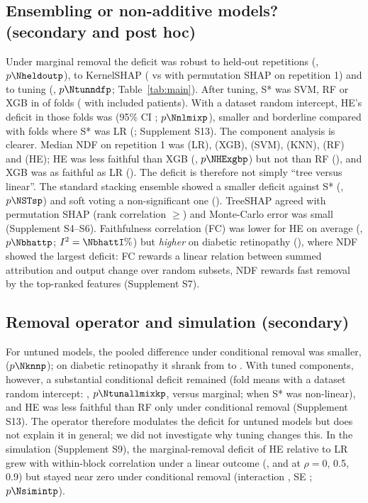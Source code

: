 \subsection{Ensembling or non-additive models? (secondary and post hoc)}
Under marginal removal the deficit was robust to held-out repetitions (\Nheldout, $p\Nheldoutp$), to KernelSHAP (\Nkernel{} vs \Nperm{} with permutation SHAP on repetition 1) and to tuning (\Ntunndf, $p\Ntunndfp$; Table~\ref{tab:main}). After tuning, S* was SVM, RF or XGB in \Nnlfoldsall{} of \Ntunfolds{} folds (\Nnlfoldsused{} with included patients). With a dataset random intercept, HE's deficit in those folds was \Nnlmix{} (95\% CI \Nnlmixci; $p\Nnlmixp$), smaller and borderline compared with folds where S* was LR (\Nlmix; Supplement S13). The component analysis is clearer. Median NDF on repetition 1 was \NmedLR{} (LR), \NmedXGB{} (XGB), \NmedSVM{} (SVM), \NmedKNN{} (KNN), \NmedRF{} (RF) and \NmedHE{} (HE); HE was less faithful than XGB (\NHExgb, $p\NHExgbp$) but not than RF (\NHErf), and XGB was as faithful as LR (\NXGBlr). The deficit is therefore not simply ``tree versus linear''. The standard stacking ensemble showed a smaller deficit against S* (\NSTs, $p\NSTsp$) and soft voting a non-significant one (\NSVs). TreeSHAP agreed with permutation SHAP (rank correlation $\ge$\Ntreerho) and Monte-Carlo error was small (Supplement S4--S6). Faithfulness correlation (FC) \cite{bhatt} was lower for HE on average (\Nbhatt, $p\Nbhattp$; $I^2=\NbhattI\%$) but \emph{higher} on diabetic retinopathy (\NFCDR), where NDF showed the largest deficit: FC rewards a linear relation between summed attribution and output change over random subsets, NDF rewards fast removal by the top-ranked features (Supplement S7).



\subsection{Removal operator and simulation (secondary)}
For untuned models, the pooled difference under conditional removal was smaller, \Nknn{} ($p\Nknnp$); on diabetic retinopathy it shrank from \NpDR{} to \NpDRknn. With tuned components, however, a substantial conditional deficit remained (fold means with a dataset random intercept: \Ntunallmixk, $p\Ntunallmixkp$, versus \Ntunallmix{} marginal; \Nnlmixk{} when S* was non-linear), and HE was less faithful than RF only under conditional removal (Supplement S13). The operator therefore modulates the deficit for untuned models but does not explain it in general; we did not investigate why tuning changes this. In the simulation (Supplement S9), the marginal-removal deficit of HE relative to LR grew with within-block correlation under a linear outcome (\NsimLzero, \NsimLhalf{} and \NsimLnine{} at $\rho=0$, 0.5, 0.9) but stayed near zero under conditional removal (interaction \Nsimint, SE \Nsimintse; $p\Nsimintp$).

